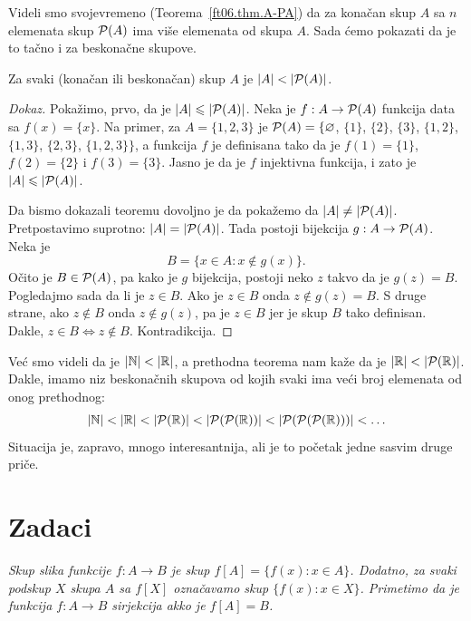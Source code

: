 Videli smo svojevremeno (Teorema~\ref{ft06.thm.A-PA}) da za kona\v can skup $A$ sa $n$ elemenata
skup $\mathcal{P}(A)$ ima vi\v se elemenata od skupa $A$. Sada \'cemo pokazati da je to ta\v cno i za
beskona\v cne skupove.

\begin{THM}
  Za svaki (kona\v can ili beskona\v can) skup $A$ je $|A| < |\mathcal{P}(A)|$.
\end{THM}
\begin{proof}[Dokaz]
  Poka\v zimo, prvo, da je $|A| \leqslant |\mathcal{P}(A)|$. Neka je $f : A \to \mathcal{P}(A)$ funkcija data sa
  $f(x) = \{x\}$. Na primer, za $A = \{1, 2, 3\}$ je $\mathcal{P}(A) = \{\varnothing$, $\{1\}$, $\{2\}$, $\{3\}$, $\{1,2\}$,
  $\{1,3\}$, $\{2,3\}$, $\{1,2,3\}\}$,
  a funkcija $f$ je definisana tako da je $f(1) = \{1\}$, $f(2) = \{2\}$ i $f(3) = \{3\}$.
  Jasno je da je $f$ injektivna funkcija, i zato je $|A| \leqslant |\mathcal{P}(A)|$.

  Da bismo dokazali teoremu dovoljno je da poka\v zemo da $|A| \ne |\mathcal{P}(A)|$.
  Pretpostavimo suprotno: $|A| = |\mathcal{P}(A)|$. Tada postoji bijekcija $g : A \to \mathcal{P}(A)$. Neka je
  $$
    B = \{ x \in A : x \notin g(x) \}.
  $$
  O\v cito je $B \in \mathcal{P}(A)$, pa kako je $g$ bijekcija, postoji neko $z$ takvo da je $g(z) = B$.
  Pogledajmo sada da li je $z \in B$. Ako je $z \in B$ onda $z \notin g(z) = B$. S druge strane,
  ako $z \notin B$ onda $z \notin g(z)$, pa je $z \in B$ jer je skup $B$ tako definisan.
  Dakle, $z \in B \Leftrightarrow z \notin B$.
  Kontradikcija.
\end{proof}

Ve\'c smo videli da je $|\mathbb{N}| < |\mathbb{R}|$, a prethodna teorema nam ka\v ze da je
\hbox{$|\mathbb{R}| < |\mathcal{P}(\mathbb{R})|$}. Dakle, imamo niz beskona\v cnih skupova od kojih svaki ima
ve\'ci broj elemenata od onog prethodnog:
$$
  |\mathbb{N}| < |\mathbb{R}| < |\mathcal{P}(\mathbb{R})| < |\mathcal{P}(\mathcal{P}(\mathbb{R}))| < |\mathcal{P}(\mathcal{P}(\mathcal{P}(\mathbb{R})))| < \ldots
$$
Situacija je, zapravo, mnogo interesantnija, ali je to po\v cetak jedne sasvim druge pri\v ce.

\section{Zadaci}

\begin{NAP}\it
\emph{Skup slika} funkcije $f:A\rightarrow B$ je skup $f[A]=\{f(x) : x\in A\}$. Dodatno, za svaki podskup $X$ skupa $A$ sa $f[X]$ ozna\v cavamo skup $\{f(x) : x\in X\}$.
Primetimo da je funkcija $f:A\rightarrow B$ sirjekcija akko je $f[A]=B$.
\end{NAP}

